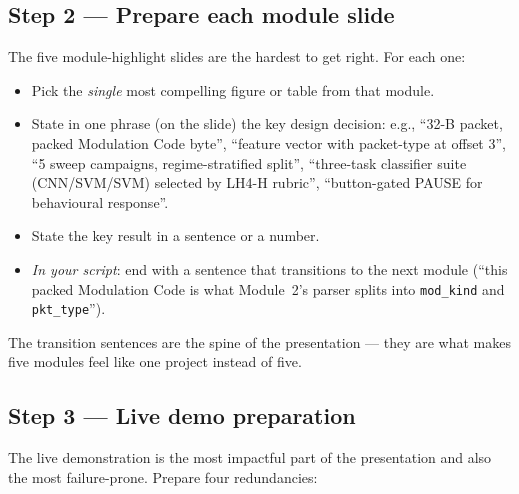 \documentclass[11pt,letterpaper]{article}
\begin{document}
\subsection{Step 2 --- Prepare each module slide}
The five module-highlight slides are the hardest to get right. For each one:
\begin{itemize}[leftmargin=2em]
	\item Pick the \emph{single} most compelling figure or table from that module.
	\item State in one phrase (on the slide) the key design decision: e.g., ``32-B packet, packed Modulation Code byte'', ``feature vector with packet-type at offset 3'', ``5 sweep campaigns, regime-stratified split'', ``three-task classifier suite (CNN/SVM/SVM) selected by LH4-H rubric'', ``button-gated PAUSE for behavioural response''.
	\item State the key result in a sentence or a number.
	\item \emph{In your script}: end with a sentence that transitions to the next module (``this packed Modulation Code is what Module~2's parser splits into \texttt{mod\_kind} and \texttt{pkt\_type}'').
\end{itemize}

The transition sentences are the spine of the presentation --- they are what makes five modules feel like one project instead of five.

\subsection{Step 3 --- Live demo preparation}
The live demonstration is the most impactful part of the presentation and also the most failure-prone. Prepare four redundancies:
\end{document}
